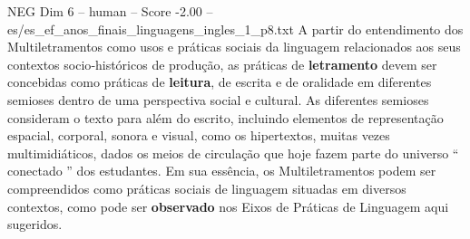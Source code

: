 \begin{textsample}{NEG Dim 6 – human – Score -2.00 – es/es\_ef\_anos\_finais\_linguagens\_ingles\_1\_p8.txt}  \label{ex:f6_neg_016}
A partir do entendimento dos Multiletramentos como usos e práticas sociais da linguagem relacionados aos seus contextos socio‐históricos de produção, as práticas de \textbf{letramento} devem ser concebidas como práticas de \textbf{leitura}, de escrita e de oralidade em diferentes semioses dentro de uma perspectiva social e cultural.
As diferentes semioses consideram o texto para além do escrito, incluindo elementos de representação espacial, corporal, sonora e visual, como os hipertextos, muitas vezes multimidiáticos, dados os meios de circulação que hoje fazem parte do universo “ conectado ” dos estudantes.
Em sua essência, os Multiletramentos podem ser compreendidos como práticas sociais de linguagem situadas em diversos contextos, como pode ser \textbf{observado} nos Eixos de Práticas de Linguagem aqui sugeridos.

\end{textsample}
